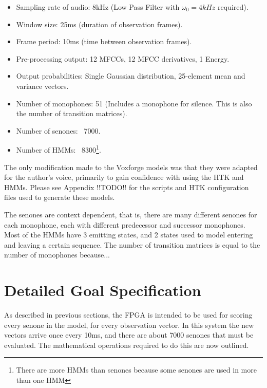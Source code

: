 	\begin{itemize}
		\item Sampling rate of audio: 8kHz (Low Pass Filter with $\omega_0 = 4kHz$ required).
		\item Window size: 25ms (duration of observation frames).
		\item Frame period: 10ms (time between observation frames).
		\item Pre-processing output: 12 MFCCs, 12 MFCC derivatives, 1 Energy.
		\item Output probabilities: Single Gaussian distribution, 25-element mean and variance vectors.
		\item Number of monophones: 51 (Includes a monophone for silence.  This is also the number of transition matrices).
		\item Number of senones: ~7000.
		\item Number of HMMs: ~8300\footnote{There are more HMMs than senones because some senones are used in more than one HMM}.
	\end{itemize}

	The only modification made to the Voxforge models was that they were adapted for the author's voice, primarily to gain confidence with using the HTK and HMMs.  Please see Appendix !!TODO!! for the scripts and HTK configuration files used to generate these models.

	The senones are context dependent, that is, there are many different senones for each monophone, each with different predecessor and successor monophones.  Most of the HMMs have 3 emitting states, and 2 states used to model entering and leaving a certain sequence. The number of transition matrices is equal to the number of monophones because...

\section{Detailed Goal Specification} %
\label{sec:goal_specification}
	As described in previous sections, the FPGA is intended to be used for scoring every senone in the model, for every observation vector.  In this system the new vectors arrive once every 10ms, and there are about 7000 senones that must be evaluated.  The mathematical operations required to do this are now outlined. %

